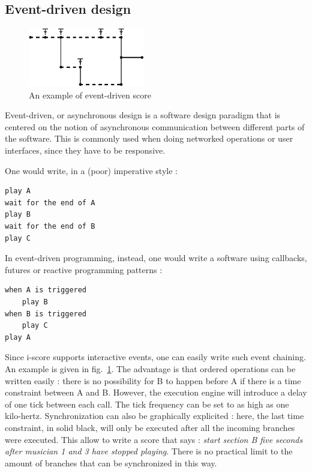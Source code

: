 \documentclass{article}
\begin{document}
\subsection{Event-driven design}
\begin{figure}
    \centering
    \includegraphics[width=0.45\textwidth]{images/event.eps}
    \caption{An example of event-driven score}
    \label{fig.event}
\end{figure}
Event-driven, or asynchronous design is a software design 
paradigm that is centered on the notion of asynchronous 
communication between different parts of the software.
This is commonly used when doing networked operations or 
user interfaces, since they have to be responsive.

One would write, in a (poor) imperative style : 
\begin{lstlisting}
play A
wait for the end of A
play B
wait for the end of B
play C
\end{lstlisting}
In event-driven programming, instead, one would write a software 
using callbacks, futures or reactive programming patterns\cite{kambona2013evaluation} :~\\
\begin{lstlisting}
when A is triggered
    play B
when B is triggered
    play C    
play A
\end{lstlisting}

Since i-score supports interactive events, one can easily write such event chaining.
An example is given in fig.~\ref{fig.event}. 
The advantage is that ordered operations can be written easily : there is no 
possibility for B to happen before A if there is a time constraint between A and B.
However, the execution engine will introduce a delay of one tick between each call.
The tick frequency can be set to as high as one kilo-hertz.
Synchronization can also be graphically explicited : here, the last time constraint, in solid black, will 
only be executed after all the incoming branches were executed. 
This allow to write a score that says : \emph{start section B five seconds after musician 1 and 3 
have stopped playing}.
There is no practical limit to the amount of branches that can be synchronized in this way.
\end{document}
